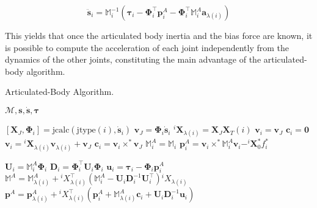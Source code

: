 \begin{equation}
    \ddot{\mathbf{s}} _i = \mathbb{M} _i ^{-1} (\boldsymbol{\tau} _i - \boldsymbol{\Phi} ^\top _i \mathbf{p} ^A _i - \boldsymbol{\Phi} ^\top _i \mathbb{M} _i ^A \mathbf{a} _{\lambda(i)})
\end{equation}

This yields that once the articulated body inertia and the bias force are known, it is possible to compute the acceleration of each joint independently from the dynamics of the other joints, constituting the main advantage of the articulated-body algorithm.

\begin{algorithm}[h]
    \caption{Articulated-Body Algorithm.}
    \label{alg:aba}
    \begin{algorithmic}[1]
        \Require $\mathcal{M}, \mathbf{s}, \dot{\mathbf{s}}, \boldsymbol{\tau}$

        \State $[\mathbf{X}_J, \boldsymbol{\Phi}_i] = \text{jcalc}(\text{jtype}(i), \dot{\mathbf{s}}_i)$
        \State $\mathrm{\mathbf{v}}_J = \boldsymbol{\Phi}_i \dot{\mathbf{s}}_i$
        \State $^i\mathbf{X}_{\lambda(i)} = \mathbf{X}_J\mathbf{X}_T (i)$
        \State $\mathrm{\mathbf{v}}_i = \mathrm{\mathbf{v}}_J$
        \State $\mathbf{c}_i = \mathbf{0}$
        \Else
        \State $\mathrm{\mathbf{v}}_i = {}^i\mathbf{X} _{\lambda(i)}\mathrm{\mathbf{v}}_{\lambda(i)} + \mathrm{\mathbf{v}}_J$
        \State $\mathbf{c}_i = \mathrm{\mathbf{v}}_i \times ^* \mathrm{\mathbf{v}}_J$
        \EndIf
        \State $\mathbb{M}_i ^A = \mathbb{M}_i$
        \State $\mathbf{p}_i ^A = \mathrm{\mathbf{v}}_i \times^* \mathbb{M}_i ^A \mathrm{\mathbf{v}}_i - ^i\mathbf{X} _0 ^* f ^* _i $
        \EndFor

        \item[]

        \State $\mathbf{U}_i = \mathbb{M}_i ^A \boldsymbol{\Phi}_i$
        \State $\mathbf{D} _i = \boldsymbol{\Phi} ^\top _i  {} \mathbf{U} _i \boldsymbol{\Phi} _i $
        \State $\mathbf{u}_i = \boldsymbol{\tau}_i - \boldsymbol{\Phi}_i\mathbf{p}_i^A$
        \State $\mathbb{M} ^A = \mathbb{M} ^A _{\lambda (i)} + {} ^i X _{\lambda (i)} ^\top (\mathbb{M} _i ^A - {}  \mathbf{U} _i  \mathbf{D} ^{-1} _i  {}  \mathbf{U} ^\top _i) {} ^i X _{\lambda (i)} $
        \State $\mathbf{p} ^A = \mathbf{p} ^A _{\lambda (i)} + {} ^i X _{\lambda (i)} ^\top (\mathbf{p} ^A_i + \mathbb{M} ^A _{\lambda (i)}  \mathbf{c}_i + {}  \mathbf{U} _i \mathbf{D} ^{-1} _i {} \mathbf{u} _i) $
        \EndIf
        \EndFor


\end{algorithmic}
\end{algorithm}
